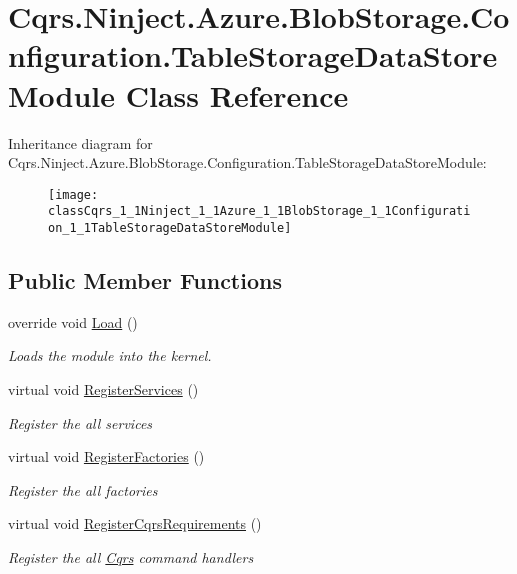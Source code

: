 \hypertarget{classCqrs_1_1Ninject_1_1Azure_1_1BlobStorage_1_1Configuration_1_1TableStorageDataStoreModule}{}\section{Cqrs.\+Ninject.\+Azure.\+Blob\+Storage.\+Configuration.\+Table\+Storage\+Data\+Store\+Module Class Reference}
\label{classCqrs_1_1Ninject_1_1Azure_1_1BlobStorage_1_1Configuration_1_1TableStorageDataStoreModule}
Inheritance diagram for Cqrs.\+Ninject.\+Azure.\+Blob\+Storage.\+Configuration.\+Table\+Storage\+Data\+Store\+Module\+:\begin{figure}[H]
\begin{center}
\leavevmode
\texttt{[image: classCqrs\_1\_1Ninject\_1\_1Azure\_1\_1BlobStorage\_1\_1Configuration\_1\_1TableStorageDataStoreModule]}
\end{center}
\end{figure}
\subsection*{Public Member Functions}
\begin{DoxyCompactItemize}
\item 
override void \hyperlink{classCqrs_1_1Ninject_1_1Azure_1_1BlobStorage_1_1Configuration_1_1TableStorageDataStoreModule_a6001f43d3102af95c34cf7f17757744e}{Load} ()
\begin{DoxyCompactList}\small\item\em Loads the module into the kernel. \end{DoxyCompactList}\item 
virtual void \hyperlink{classCqrs_1_1Ninject_1_1Azure_1_1BlobStorage_1_1Configuration_1_1TableStorageDataStoreModule_a0c3827b5d9513cd19787768db79c32b4}{Register\+Services} ()
\begin{DoxyCompactList}\small\item\em Register the all services \end{DoxyCompactList}\item 
virtual void \hyperlink{classCqrs_1_1Ninject_1_1Azure_1_1BlobStorage_1_1Configuration_1_1TableStorageDataStoreModule_a785a2d032063d28d39d0c0f66f5f727f}{Register\+Factories} ()
\begin{DoxyCompactList}\small\item\em Register the all factories \end{DoxyCompactList}\item 
virtual void \hyperlink{classCqrs_1_1Ninject_1_1Azure_1_1BlobStorage_1_1Configuration_1_1TableStorageDataStoreModule_ab60aa0dc969f6262e483f1bbf51655a8}{Register\+Cqrs\+Requirements} ()
\begin{DoxyCompactList}\small\item\em Register the all \hyperlink{namespaceCqrs}{Cqrs} command handlers \end{DoxyCompactList}\end{DoxyCompactItemize}


